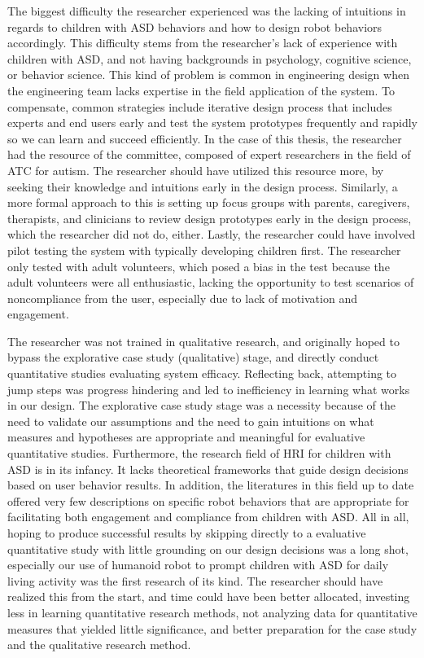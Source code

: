 \documentclass{ut-thesis}
\begin{document}
The biggest difficulty the researcher experienced was the lacking of intuitions in regards to children with ASD behaviors and how to design robot behaviors accordingly.  This difficulty stems from the researcher's lack of experience with children with ASD, and not having backgrounds in psychology, cognitive science, or behavior science.  This kind of problem is common in engineering design when the engineering team lacks expertise in the field application of the system.  To compensate, common strategies include iterative design process that includes experts and end users early and test the system prototypes frequently and rapidly so we can learn and succeed efficiently.  In the case of this thesis, the researcher had the resource of the committee, composed of expert researchers in the field of ATC for autism.  The researcher should have utilized this resource more, by seeking their knowledge and intuitions early in the design process.  Similarly, a more formal approach to this is setting up focus groups with parents, caregivers, therapists, and clinicians to review design prototypes early in the design process, which the researcher did not do, either.  Lastly, the researcher could have involved pilot testing the system with typically developing children first.  The researcher only tested with adult volunteers, which posed a bias in the test because the adult volunteers were all enthusiastic, lacking the opportunity to test scenarios of noncompliance from the user, especially due to lack of motivation and engagement.

The researcher was not trained in qualitative research, and originally hoped to bypass the explorative case study (qualitative) stage, and directly conduct quantitative studies evaluating system efficacy.  Reflecting back, attempting to jump steps was progress hindering and led to inefficiency in learning what works in our design.  The explorative case study stage was a necessity because of the need to validate our assumptions and the need to gain intuitions on what measures and hypotheses are appropriate and meaningful for evaluative quantitative studies.  Furthermore, the research field of HRI for children with ASD is in its infancy.  It lacks theoretical frameworks that guide design decisions based on user behavior results.  In addition, the literatures in this field up to date offered very few descriptions on specific robot behaviors that are appropriate for facilitating both engagement and compliance from children with ASD.  All in all, hoping to produce successful results by skipping directly to a evaluative quantitative study with little grounding on our design decisions was a long shot, especially our use of humanoid robot to prompt children with ASD for daily living activity was the first research of its kind.  The researcher should have realized this from the start, and time could have been better allocated, investing less in learning quantitative research methods, not analyzing data for quantitative measures that yielded little significance, and better preparation for the case study and the qualitative research method.
\end{document}
